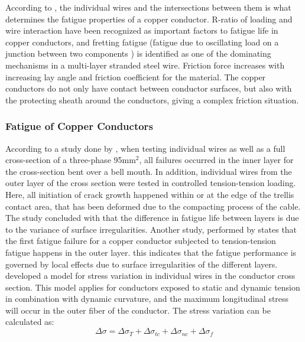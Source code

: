 \noindent According to \cite{Karlsen2010}, the individual wires and the intersections between them is what determines the fatigue properties of a copper conductor. R-ratio of loading and wire interaction have been recognized as important factors to fatigue life in copper conductors, and fretting fatigue (fatigue due to oscillating load on a junction between two components \cite{Hills1994}) is identified as one of the dominating mechanisms in a multi-layer stranded steel wire. Friction force increases with increasing lay angle and friction coefficient for the material. The copper conductors do not only have contact between conductor surfaces, but also with the protecting sheath around the conductors, giving a complex friction situation.

\subsubsection{Fatigue of Copper Conductors}
\label{sec:fatcop}
According to a study done by \cite{Nasution2013}, when testing individual wires as well as a full cross-section of a three-phase 95mm$^2$, all failures occurred in the inner layer for the cross-section bent over a bell mouth. In addition, individual wires from the outer layer of the cross section were tested in controlled tension-tension loading. Here, all initiation of crack growth happened within or at the edge of the trellis contact area, that has been deformed due to the compacting process of the cable. The study concluded with that the difference in fatigue life between layers is due to the variance of surface irregularities. Another study, performed by \cite{NASUTION2014} states that the first fatigue failure for a copper conductor subjected to tension-tension fatigue happens in the outer layer. this indicates that the fatigue performance is governed by local effects due to surface irregularities of the different layers. \newline
\newline
\noindent \cite{s300} developed a model for stress variation in individual wires in the conductor cross section. This model applies for conductors exposed to static and dynamic tension in combination with dynamic curvature, and the maximum longitudinal stress will occur in the outer fiber of the conductor. The stress variation can be calculated as:   
\begin{equation}
    \Delta \sigma = \Delta \sigma_T + \Delta \sigma_{tc} + \Delta \sigma_{nc} + \Delta \sigma_{f}
    \label{eq:stressvariation}
\end{equation}
